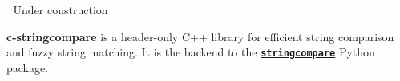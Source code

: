 \label{index_md_README}%
%
 🚧 Under construction 🚧

{\bfseries{c-\/stringcompare}} is a header-\/only C++ library for efficient string comparison and fuzzy string matching. It is the backend to the \href{https://github.com/olivierBinette/stringcompare}{\texttt{ {\bfseries{stringcompare}}}} Python package. 